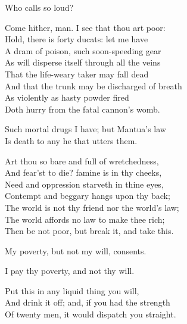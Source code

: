 \begin{speech}
Who calls so loud? \\
\end{speech}
\begin{speech}
Come hither, man.   I see that thou art poor: \\
Hold, there is forty ducats: let me have \\
A dram of poison, such soon-speeding gear \\
As will disperse itself through all the veins \\
That the life-weary taker may fall dead \\
And that the trunk may be discharged of breath \\
As violently as hasty powder fired \\
Doth hurry from the fatal cannon's womb. \\
\end{speech}
\begin{speech}
Such mortal drugs I have; but Mantua's law \\
Is death to any he that utters them. \\
\end{speech}
\begin{speech}
Art thou so bare and full of wretchedness, \\
And fear'st to die? famine is in thy cheeks, \\
Need and oppression starveth in thine eyes, \\
Contempt and beggary hangs upon thy back; \\
The world is not thy friend nor the world's law; \\
The world affords no law to make thee rich; \\
Then be not poor, but break it, and take this. \\
\end{speech}
\begin{speech}
My poverty, but not my will, consents. \\
\end{speech}
\begin{speech}
I pay thy poverty, and not thy will. \\
\end{speech}
\begin{speech}
Put this in any liquid thing you will, \\
And drink it off; and, if you had the strength \\
Of twenty men, it would dispatch you straight. \\
\end{speech}
